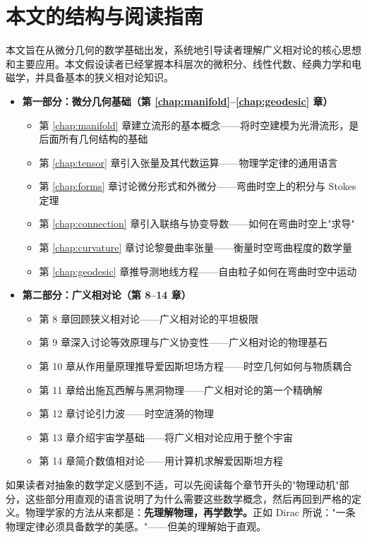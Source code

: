 \section{本文的结构与阅读指南}

本文旨在从微分几何的数学基础出发，系统地引导读者理解广义相对论的核心思想和主要应用。本文假设读者已经掌握本科层次的微积分、线性代数、经典力学和电磁学，并具备基本的狭义相对论知识。

\begin{itemize}
    \item \textbf{第一部分：微分几何基础（第 \ref{chap:manifold}--\ref{chap:geodesic} 章）}
    \begin{itemize}
        \item 第 \ref{chap:manifold} 章建立流形的基本概念——将时空建模为光滑流形，是后面所有几何结构的基础
        \item 第 \ref{chap:tensor} 章引入张量及其代数运算——物理学定律的通用语言
        \item 第 \ref{chap:forms} 章讨论微分形式和外微分——弯曲时空上的积分与 Stokes 定理
        \item 第 \ref{chap:connection} 章引入联络与协变导数——如何在弯曲时空上"求导"
        \item 第 \ref{chap:curvature} 章讨论黎曼曲率张量——衡量时空弯曲程度的数学量
        \item 第 \ref{chap:geodesic} 章推导测地线方程——自由粒子如何在弯曲时空中运动
    \end{itemize}
    \item \textbf{第二部分：广义相对论（第 8--14 章）}
    \begin{itemize}
        \item 第 8 章回顾狭义相对论——广义相对论的平坦极限
        \item 第 9 章深入讨论等效原理与广义协变性——广义相对论的物理基石
        \item 第 10 章从作用量原理推导爱因斯坦场方程——时空几何如何与物质耦合
        \item 第 11 章给出施瓦西解与黑洞物理——广义相对论的第一个精确解
        \item 第 12 章讨论引力波——时空涟漪的物理
        \item 第 13 章介绍宇宙学基础——将广义相对论应用于整个宇宙
        \item 第 14 章简介数值相对论——用计算机求解爱因斯坦方程
    \end{itemize}
\end{itemize}

\begin{remark}
如果读者对抽象的数学定义感到不适，可以先阅读每个章节开头的"物理动机"部分，这些部分用直观的语言说明了为什么需要这些数学概念，然后再回到严格的定义。物理学家的方法从来都是：\textbf{先理解物理，再学数学。}正如 Dirac 所说："一条物理定律必须具备数学的美感。"——但美的理解始于直观。
\end{remark}

